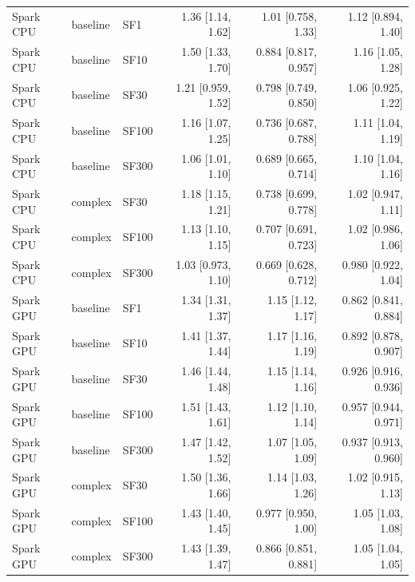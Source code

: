 \begin{longtable}{lllrrr}
Spark CPU & baseline & SF1 & 1.36 [1.14, 1.62] & 1.01 [0.758, 1.33] & 1.12 [0.894, 1.40] \\
Spark CPU & baseline & SF10 & 1.50 [1.33, 1.70] & 0.884 [0.817, 0.957] & 1.16 [1.05, 1.28] \\
Spark CPU & baseline & SF30 & 1.21 [0.959, 1.52] & 0.798 [0.749, 0.850] & 1.06 [0.925, 1.22] \\
Spark CPU & baseline & SF100 & 1.16 [1.07, 1.25] & 0.736 [0.687, 0.788] & 1.11 [1.04, 1.19] \\
Spark CPU & baseline & SF300 & 1.06 [1.01, 1.10] & 0.689 [0.665, 0.714] & 1.10 [1.04, 1.16] \\
Spark CPU & complex & SF30 & 1.18 [1.15, 1.21] & 0.738 [0.699, 0.778] & 1.02 [0.947, 1.11] \\
Spark CPU & complex & SF100 & 1.13 [1.10, 1.15] & 0.707 [0.691, 0.723] & 1.02 [0.986, 1.06] \\
Spark CPU & complex & SF300 & 1.03 [0.973, 1.10] & 0.669 [0.628, 0.712] & 0.980 [0.922, 1.04] \\
Spark GPU & baseline & SF1 & 1.34 [1.31, 1.37] & 1.15 [1.12, 1.17] & 0.862 [0.841, 0.884] \\
Spark GPU & baseline & SF10 & 1.41 [1.37, 1.44] & 1.17 [1.16, 1.19] & 0.892 [0.878, 0.907] \\
Spark GPU & baseline & SF30 & 1.46 [1.44, 1.48] & 1.15 [1.14, 1.16] & 0.926 [0.916, 0.936] \\
Spark GPU & baseline & SF100 & 1.51 [1.43, 1.61] & 1.12 [1.10, 1.14] & 0.957 [0.944, 0.971] \\
Spark GPU & baseline & SF300 & 1.47 [1.42, 1.52] & 1.07 [1.05, 1.09] & 0.937 [0.913, 0.960] \\
Spark GPU & complex & SF30 & 1.50 [1.36, 1.66] & 1.14 [1.03, 1.26] & 1.02 [0.915, 1.13] \\
Spark GPU & complex & SF100 & 1.43 [1.40, 1.45] & 0.977 [0.950, 1.00] & 1.05 [1.03, 1.08] \\
Spark GPU & complex & SF300 & 1.43 [1.39, 1.47] & 0.866 [0.851, 0.881] & 1.05 [1.04, 1.05] \\
\end{longtable}
